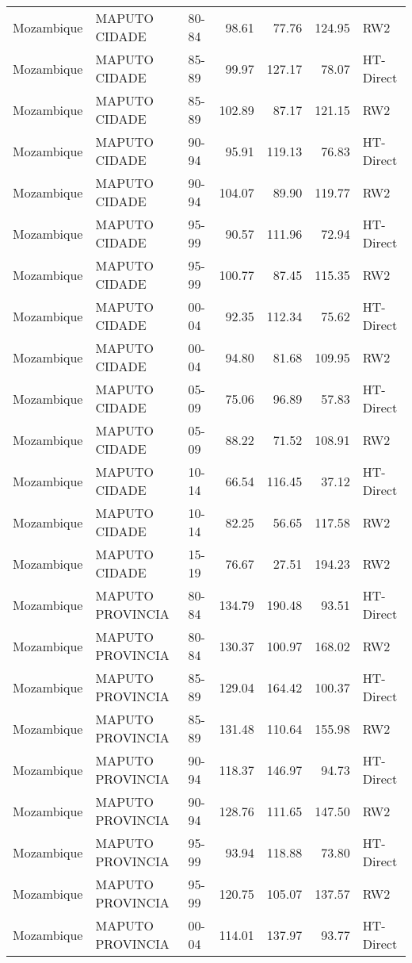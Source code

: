 \begin{longtable}{lllrrrl}
  Mozambique & MAPUTO CIDADE & 80-84 & 98.61 & 77.76 & 124.95 & RW2 \\ 
  Mozambique & MAPUTO CIDADE & 85-89 & 99.97 & 127.17 & 78.07 & HT-Direct \\ 
  Mozambique & MAPUTO CIDADE & 85-89 & 102.89 & 87.17 & 121.15 & RW2 \\ 
  Mozambique & MAPUTO CIDADE & 90-94 & 95.91 & 119.13 & 76.83 & HT-Direct \\ 
  Mozambique & MAPUTO CIDADE & 90-94 & 104.07 & 89.90 & 119.77 & RW2 \\ 
  Mozambique & MAPUTO CIDADE & 95-99 & 90.57 & 111.96 & 72.94 & HT-Direct \\ 
  Mozambique & MAPUTO CIDADE & 95-99 & 100.77 & 87.45 & 115.35 & RW2 \\ 
  Mozambique & MAPUTO CIDADE & 00-04 & 92.35 & 112.34 & 75.62 & HT-Direct \\ 
  Mozambique & MAPUTO CIDADE & 00-04 & 94.80 & 81.68 & 109.95 & RW2 \\ 
  Mozambique & MAPUTO CIDADE & 05-09 & 75.06 & 96.89 & 57.83 & HT-Direct \\ 
  Mozambique & MAPUTO CIDADE & 05-09 & 88.22 & 71.52 & 108.91 & RW2 \\ 
  Mozambique & MAPUTO CIDADE & 10-14 & 66.54 & 116.45 & 37.12 & HT-Direct \\ 
  Mozambique & MAPUTO CIDADE & 10-14 & 82.25 & 56.65 & 117.58 & RW2 \\ 
  Mozambique & MAPUTO CIDADE & 15-19 & 76.67 & 27.51 & 194.23 & RW2 \\ 
  Mozambique & MAPUTO PROVINCIA & 80-84 & 134.79 & 190.48 & 93.51 & HT-Direct \\ 
  Mozambique & MAPUTO PROVINCIA & 80-84 & 130.37 & 100.97 & 168.02 & RW2 \\ 
  Mozambique & MAPUTO PROVINCIA & 85-89 & 129.04 & 164.42 & 100.37 & HT-Direct \\ 
  Mozambique & MAPUTO PROVINCIA & 85-89 & 131.48 & 110.64 & 155.98 & RW2 \\ 
  Mozambique & MAPUTO PROVINCIA & 90-94 & 118.37 & 146.97 & 94.73 & HT-Direct \\ 
  Mozambique & MAPUTO PROVINCIA & 90-94 & 128.76 & 111.65 & 147.50 & RW2 \\ 
  Mozambique & MAPUTO PROVINCIA & 95-99 & 93.94 & 118.88 & 73.80 & HT-Direct \\ 
  Mozambique & MAPUTO PROVINCIA & 95-99 & 120.75 & 105.07 & 137.57 & RW2 \\ 
  Mozambique & MAPUTO PROVINCIA & 00-04 & 114.01 & 137.97 & 93.77 & HT-Direct \\ 

\end{longtable}
